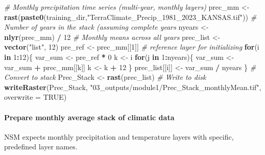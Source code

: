 \documentclass[
  10pt,
  b5paper,
  oneside]{book}
\newenvironment{Shaded}{\begin{snugshade}}{\end{snugshade}}
\newcommand{\AttributeTok}[1]{\textcolor[rgb]{0.13,0.29,0.53}{#1}}
\newcommand{\CommentTok}[1]{\textcolor[rgb]{0.56,0.35,0.01}{\textit{#1}}}
\newcommand{\ConstantTok}[1]{\textcolor[rgb]{0.56,0.35,0.01}{#1}}
\newcommand{\ControlFlowTok}[1]{\textcolor[rgb]{0.13,0.29,0.53}{\textbf{#1}}}
\newcommand{\DecValTok}[1]{\textcolor[rgb]{0.00,0.00,0.81}{#1}}
\newcommand{\FunctionTok}[1]{\textcolor[rgb]{0.13,0.29,0.53}{\textbf{#1}}}
\newcommand{\NormalTok}[1]{#1}
\newcommand{\OtherTok}[1]{\textcolor[rgb]{0.56,0.35,0.01}{#1}}
\newcommand{\SpecialCharTok}[1]{\textcolor[rgb]{0.81,0.36,0.00}{\textbf{#1}}}
\newcommand{\StringTok}[1]{\textcolor[rgb]{0.31,0.60,0.02}{#1}}
\begin{document}
\begin{Shaded}
\begin{Highlighting}[]
\CommentTok{\# Monthly precipitation time series (multi{-}year, monthly layers)}
\NormalTok{prec\_mm }\OtherTok{\textless{}{-}} \FunctionTok{rast}\NormalTok{(}\FunctionTok{paste0}\NormalTok{(training\_dir,}\StringTok{"TerraClimate\_Precip\_1981\_2023\_KANSAS.tif"}\NormalTok{))}
\CommentTok{\# Number of years in the stack (assuming complete years}
\NormalTok{nyears }\OtherTok{\textless{}{-}} \FunctionTok{nlyr}\NormalTok{(prec\_mm) }\SpecialCharTok{/} \DecValTok{12}
\CommentTok{\# Monthly means across all years}
\NormalTok{prec\_list }\OtherTok{\textless{}{-}} \FunctionTok{vector}\NormalTok{(}\StringTok{"list"}\NormalTok{, }\DecValTok{12}\NormalTok{)}
\NormalTok{pre\_ref }\OtherTok{\textless{}{-}}\NormalTok{ prec\_mm[[}\DecValTok{1}\NormalTok{]] }\CommentTok{\# reference layer for initializing}
\ControlFlowTok{for}\NormalTok{(i }\ControlFlowTok{in} \DecValTok{1}\SpecialCharTok{:}\DecValTok{12}\NormalTok{)\{}
\NormalTok{  var\_sum }\OtherTok{\textless{}{-}}\NormalTok{ pre\_ref }\SpecialCharTok{*} \DecValTok{0}
\NormalTok{  k }\OtherTok{\textless{}{-}}\NormalTok{ i}
  \ControlFlowTok{for}\NormalTok{(j }\ControlFlowTok{in} \DecValTok{1}\SpecialCharTok{:}\NormalTok{nyears)\{}
\NormalTok{    var\_sum }\OtherTok{\textless{}{-}}\NormalTok{ var\_sum }\SpecialCharTok{+}\NormalTok{ prec\_mm[[k]]}
\NormalTok{    k }\OtherTok{\textless{}{-}}\NormalTok{ k }\SpecialCharTok{+} \DecValTok{12}
\NormalTok{  \}}
\NormalTok{  prec\_list[[i]] }\OtherTok{\textless{}{-}}\NormalTok{ var\_sum }\SpecialCharTok{/}\NormalTok{ nyears}
\NormalTok{\}}
\CommentTok{\# Convert to stack}
\NormalTok{Prec\_Stack }\OtherTok{\textless{}{-}} \FunctionTok{rast}\NormalTok{(prec\_list)}
\CommentTok{\# Write to disk}
\FunctionTok{writeRaster}\NormalTok{(Prec\_Stack, }\StringTok{"03\_outputs/module1/Prec\_Stack\_monthlyMean.tif"}\NormalTok{, }\AttributeTok{overwrite =} \ConstantTok{TRUE}\NormalTok{)}
\end{Highlighting}
\end{Shaded}

\paragraph*{Prepare monthly average stack of climatic data}\label{prepare-monthly-average-stack-of-climatic-data}

NSM expects monthly precipitation and temperature layers with specific, predefined layer names.
\end{document}
